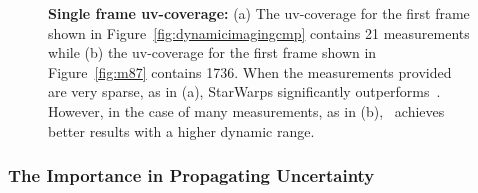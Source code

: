 \begin{figure}[h!]
	\vspace*{-.3in}
	\centering
	\vspace{-.1in}
	\caption{{\bf Single frame uv-coverage:} (a) The uv-coverage for the first frame shown in Figure~\ref{fig:dynamicimagingcmp} contains 21 measurements while (b) the uv-coverage for the first frame shown in Figure~\ref{fig:m87} contains 1736. When the measurements provided are very sparse, as in (a), StarWarps significantly outperforms~\cite{Johnson_dynamical}. However, in the case of many measurements, as in (b),~\cite{Johnson_dynamical} achieves better results with a higher dynamic range.  }
	\label{fig:uvcov3}
	\vspace{-.25in}
	
\end{figure}





\subsubsection{The Importance in Propagating Uncertainty}


